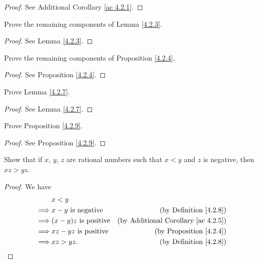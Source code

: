 \begin{proof}
    See Additional Corollary \ref{ac 4.2.1}.
\end{proof}

\begin{exercise}\label{ex 4.2.2}
    Prove the remaining components of Lemma \ref{4.2.3}.
\end{exercise}

\begin{proof}
    See Lemma \ref{4.2.3}.
\end{proof}

\begin{exercise}\label{ex 4.2.3}
    Prove the remaining components of Proposition \ref{4.2.4}.
\end{exercise}

\begin{proof}
    See Proposition \ref{4.2.4}.
\end{proof}

\begin{exercise}\label{ex 4.2.4}
    Prove Lemma \ref{4.2.7}.
\end{exercise}

\begin{proof}
    See Lemma \ref{4.2.7}.
\end{proof}

\begin{exercise}\label{ex 4.2.5}
    Prove Proposition \ref{4.2.9}.
\end{exercise}

\begin{proof}
    See Proposition \ref{4.2.9}.
\end{proof}

\begin{exercise}\label{ex 4.2.6}
    Show that if \(x\), \(y\), \(z\) are rational numbers such that \(x < y\) and \(z\) is negative, then \(xz > yz\).
\end{exercise}

\begin{proof}
    We have
    \begin{align*}
                 & x < y                                                                          \\
        \implies & x - y \text{ is negative}    & \text{(by Definition \ref{4.2.8})}              \\
        \implies & (x - y)z \text{ is positive} & \text{(by Additional Corollary \ref{ac 4.2.5})} \\
        \implies & xz - yz \text{ is positive}  & \text{(by Proposition \ref{4.2.4})}             \\
        \implies & xz > yz.                     & \text{(by Definition \ref{4.2.8})}
    \end{align*}
\end{proof}